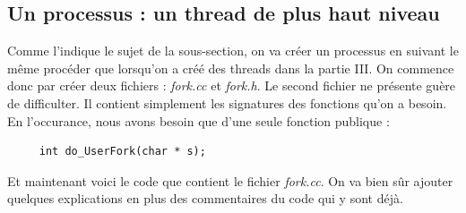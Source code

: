 \documentclass[a4paper,10pt]{article}
\begin{document}
    \textcolor{NavyBlue}{\subsection{Un processus : un thread de plus haut niveau}}
    Comme l'indique le sujet de la sous-section, on va créer un processus en suivant le même procéder que lorsqu'on a créé des threads dans la partie III.
    On commence donc par créer deux fichiers : \emph{fork.cc} et \emph{fork.h}. Le second fichier ne présente guère de difficulter. Il contient simplement
    les signatures des fonctions qu'on a besoin. En l'occurance, nous avons besoin que d'une seule fonction publique :
    \begin{lstlisting}
     int do_UserFork(char * s);
    \end{lstlisting}
    Et maintenant voici le code que contient le fichier \emph{fork.cc}. On va bien sûr ajouter quelques explications en plus des commentaires du code qui 
    y sont déjà.
    
\end{document}
